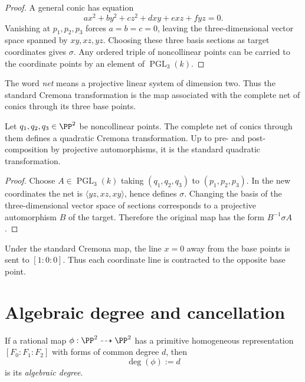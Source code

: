 \begin{proof}
A general conic has equation
\[
 ax^2+by^2+cz^2+dxy+exz+fyz=0.
\]
Vanishing at \(p_1,p_2,p_3\) forces \(a=b=c=0\), leaving the three-dimensional vector space spanned by \(xy,xz,yz\).  Choosing these three basis sections as target coordinates gives \(\sigma\).  Any ordered triple of noncollinear points can be carried to the coordinate points by an element of \(\operatorname{PGL}_3(k)\).
\end{proof}

The word \emph{net} means a projective linear system of dimension two.  Thus the standard Cremona transformation is the map associated with the complete net of conics through its three base points.

\begin{proposition}\label{prop:vi44-general-quadratic}
Let \(q_1,q_2,q_3\in\PP^2\) be noncollinear points.  The complete net of conics through them defines a quadratic Cremona transformation.  Up to pre- and post-composition by projective automorphisms, it is the standard quadratic transformation.
\end{proposition}

\begin{proof}
Choose \(A\in\operatorname{PGL}_3(k)\) taking \((q_1,q_2,q_3)\) to \((p_1,p_2,p_3)\).  In the new coordinates the net is \(\langle yz,xz,xy\rangle\), hence defines \(\sigma\).  Changing the basis of the three-dimensional vector space of sections corresponds to a projective automorphism \(B\) of the target.  Therefore the original map has the form \(B^{-1}\sigma A\).
\end{proof}

\begin{example}\label{ex:vi44-expand-02}
Under the standard Cremona map, the line $x=0$ away from the base points is sent to $[1:0:0]$.  Thus each coordinate line is contracted to the opposite base point.
\end{example}
\section{Algebraic degree and cancellation}

\begin{definition}\label{def:vi44-algebraic-degree}
If a rational map \(\phi:\PP^2\dashrightarrow\PP^2\) has a primitive homogeneous representation \([F_0:F_1:F_2]\) with forms of common degree \(d\), then
\[
  \deg(\phi):=d
\]
is its \emph{algebraic degree}.
\end{definition}

